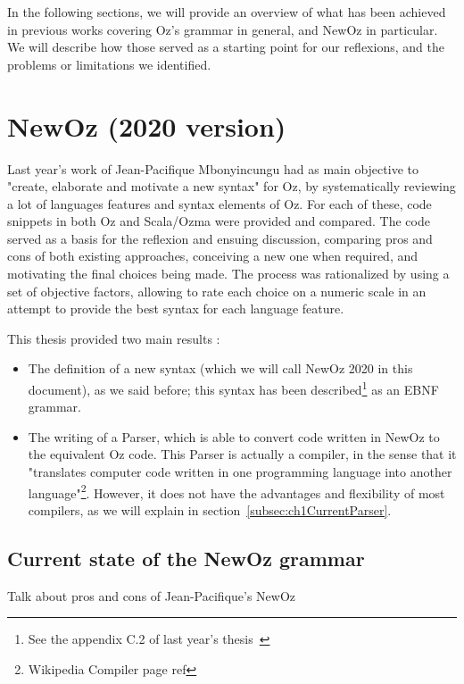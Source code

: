 In the following sections, we will provide an overview of what has been achieved in previous works covering Oz's grammar in general, and NewOz in particular.
We will describe how those served as a starting point for our reflexions, and the problems or limitations we identified.\newline

\section{NewOz (2020 version)}\label{sec:ch1JPNewOz}
Last year's work of Jean-Pacifique Mbonyincungu had as main objective to "create, elaborate and motivate a new syntax"\cite{jpthesis} for Oz, by systematically reviewing a lot of languages features and syntax elements of Oz.
For each of these, code snippets in both Oz and Scala/Ozma were provided and compared.
The code served as a basis for the reflexion and ensuing discussion, comparing pros and cons of both existing approaches, conceiving a new one when required, and motivating the final choices being made.
The process was rationalized by using a set of objective factors, allowing to rate each choice on a numeric scale in an attempt to provide the best syntax for each language feature.\newline

This thesis provided two main results :
\begin{itemize}
    \item The definition of a new syntax (which we will call NewOz 2020 in this document), as we said before;
    this syntax has been described\footnote{See the appendix C.2 of last year's thesis~\cite{jpthesis}} as an EBNF grammar.
    \item The writing of a Parser, which is able to convert code written in NewOz to the equivalent Oz code.
    This Parser is actually a compiler, in the sense that it "translates computer code written in one programming language into another language"\footnote{Wikipedia Compiler page ref}.
    However, it does not have the advantages and flexibility of most compilers, as we will explain in section~\ref{subsec:ch1CurrentParser}.
\end{itemize}

\subsection{Current state of the NewOz grammar}\label{subsec:ch1CurrentGrammar}
Talk about pros and cons of Jean-Pacifique's NewOz

